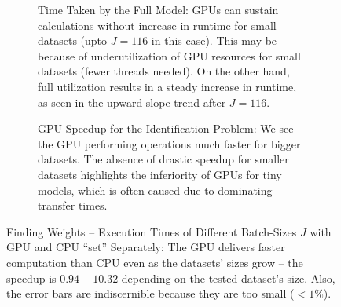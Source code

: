 \begin{figure}[!htbp]
\begin{subfigure}{\textwidth}
        \caption{Time Taken by the Full Model: GPUs can sustain calculations without increase in runtime for small datasets (upto $J=116$ in this case). This may be because of underutilization of GPU resources for small datasets (fewer threads needed). On the other hand, full utilization results in a steady increase in runtime, as seen in the upward slope trend after $J=116$.}
    \end{subfigure}\vspace*{1em}
    \begin{subfigure}{\textwidth}
        \centering
        \caption{GPU Speedup for the Identification Problem: We see the GPU performing operations much faster for bigger datasets. The absence of drastic speedup for smaller datasets highlights the inferiority of GPUs for tiny models, which is often caused due to dominating transfer times.}
    \end{subfigure}
    \caption[Finding Weights -- Execution Times of Different Batch-Sizes $J$ with GPU and CPU ``set'' Separately]{Finding Weights -- Execution Times of Different Batch-Sizes $J$ with GPU and CPU ``set'' Separately: The GPU delivers faster computation than CPU even as the datasets' sizes grow -- the speedup is $0.94-10.32$ depending on the tested dataset's size. Also, the error bars are indiscernible because they are too small ($< 1\%$).}
    \label{fig:Execution Times of Different Batch-Sizes with GPU and CPU ``set'' Separately}
\end{figure}

